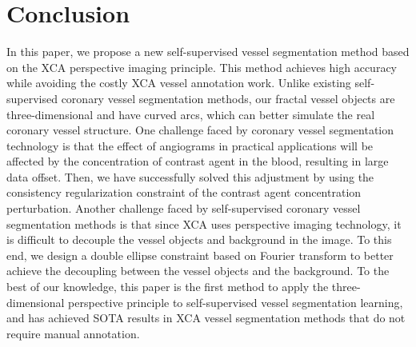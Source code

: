 \section{Conclusion}

In this paper, we propose a new self-supervised vessel segmentation method based on the XCA perspective imaging principle. 
This method achieves high accuracy while avoiding the costly XCA vessel annotation work. 
Unlike existing self-supervised coronary vessel segmentation methods, our fractal vessel objects are three-dimensional and have curved arcs, 
which can better simulate the real coronary vessel structure. 
One challenge faced by coronary vessel segmentation technology is that the effect of angiograms in practical applications will be affected by the concentration of contrast agent in the blood, resulting in large data offset. 
Then, 
we have successfully solved this adjustment by using the consistency regularization constraint of the contrast agent concentration perturbation. 
Another challenge faced by self-supervised coronary vessel segmentation methods is that since XCA uses perspective imaging technology, 
it is difficult to decouple the vessel objects and background in the image. To this end, 
we design a double ellipse constraint based on Fourier transform to better achieve the decoupling between the vessel objects and the background. 
To the best of our knowledge, 
this paper is the first method to apply the three-dimensional perspective principle to self-supervised vessel segmentation learning, 
and has achieved SOTA results in XCA vessel segmentation methods that do not require manual annotation.